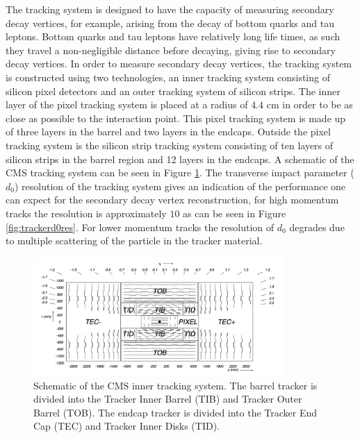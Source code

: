 The tracking system is designed to have the capacity of measuring secondary decay vertices, for example, arising from the decay of bottom quarks and tau leptons.
Bottom quarks and tau leptons have relatively long life times, as such they travel a non-negligible distance before decaying, giving rise to secondary decay vertices.
In order to measure secondary decay vertices, the tracking system is constructed using two technologies, an inner tracking system consisting of silicon pixel detectors and an outer tracking system of silicon strips.
The inner layer of the pixel tracking system is placed at a radius of $4.4$ cm in order to be as close as possible to the interaction point.
This pixel tracking system is made up of three layers in the barrel and two layers in the endcaps.
Outside the pixel tracking system is the silicon strip tracking system consisting of ten layers of silicon strips in the barrel region and 12 layers in the endcaps. 
A schematic of the CMS tracking system can be seen in Figure \ref{fig:trackerlayout}.
The transverse impact parameter ($d_{0}$) resolution of the tracking system gives an indication of the performance one can expect for the secondary decay vertex reconstruction, for high momentum tracks the resolution is approximately $10$ \micrometer as can be seen in Figure \ref{fig:trackerd0res}. %
For lower momentum tracks the resolution of $d_{0}$ degrades due to multiple scattering of the particle in the tracker material.
\begin{figure}[htpb]
\begin{center}
\includegraphics[width=0.85\textwidth]{plots/trackerlayout.png}
\caption{Schematic of the CMS inner tracking system\cite{CMS_DETECTOR}. The barrel tracker is divided into the Tracker Inner Barrel (TIB) and Tracker Outer Barrel (TOB). The endcap tracker is divided into the Tracker End Cap (TEC) and Tracker Inner Disks (TID).}
\label{fig:trackerlayout}
\end{center}
\end{figure}

